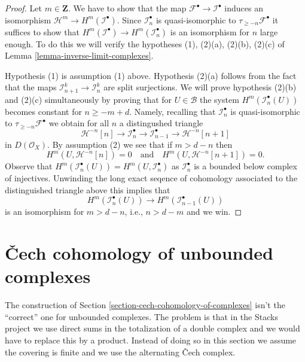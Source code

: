 \begin{proof}
Let $m \in \mathbf{Z}$.
We have to show that the map $\mathcal{F}^\bullet \to \mathcal{I}^\bullet$
induces an isomorphism $\mathcal{H}^m \to H^m(\mathcal{I}^\bullet)$.
Since $\mathcal{I}_n^\bullet$ is quasi-isomorphic to
$\tau_{\geq -n}\mathcal{F}^\bullet$ it suffices to show that
$H^m(\mathcal{I}^\bullet) \to H^m(\mathcal{I}_n^\bullet)$
is an isomorphism for $n$ large enough. To do this we will verify the
hypotheses (1), (2)(a), (2)(b), (2)(c) of
Lemma \ref{lemma-inverse-limit-complexes}.

\medskip\noindent
Hypothesis (1) is assumption (1) above. Hypothesis (2)(a) follows
from the fact that the maps $\mathcal{I}_{n + 1}^k \to \mathcal{I}_n^k$
are split surjections. We will prove hypothesis (2)(b) and (2)(c)
simultaneously by proving that for $U \in \mathcal{B}$ the system
$H^m(\mathcal{I}_n^\bullet(U))$ becomes constant for $n \geq -m + d$.
Namely, recalling that $\mathcal{I}_n^\bullet$ is quasi-isomorphic
to $\tau_{\geq -n}\mathcal{F}^\bullet$ we obtain for all $n$
a distingushed triangle
$$
\mathcal{H}^{-n}[n] \to \mathcal{I}_n^\bullet \to
\mathcal{I}_{n - 1}^\bullet \to \mathcal{H}^{-n}[n + 1]
$$
in $D(\mathcal{O}_X)$. By assumption (2) we see that if $m > d - n$ then
$$
H^m(U, \mathcal{H}^{-n}[n]) = 0
\quad\text{and}\quad
H^m(U, \mathcal{H}^{-n}[n + 1]) = 0.
$$
Observe that $H^m(\mathcal{I}_n^\bullet(U)) = H^m(U, \mathcal{I}_n^\bullet)$
as $\mathcal{I}_n^\bullet$ is a bounded below complex of injectives.
Unwinding the long exact seqence of cohomology associated to the distinguished
triangle above this implies that
$$
H^m(\mathcal{I}_n^\bullet(U)) \to H^m(\mathcal{I}_{n - 1}^\bullet(U))
$$
is an isomorphism for $m > d - n$, i.e., $n > d - m$ and we win.
\end{proof}















\section{{\v C}ech cohomology of unbounded complexes}
\label{section-cech-cohomology-of-unbounded-complexes}

\noindent
The construction of Section \ref{section-cech-cohomology-of-complexes}
isn't the ``correct'' one for unbounded complexes. The problem is that
in the Stacks project we use direct sums in the totalization of a
double complex and we would have to replace this by a product. Instead
of doing so in this section we assume the covering is finite and
we use the alternating {\v C}ech complex.

